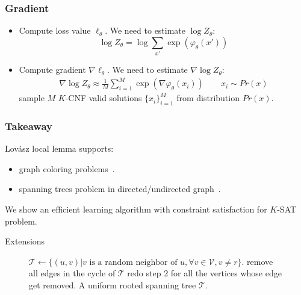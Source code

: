 \documentclass[numfooter,aspectratio=169]{beamer}
\begin{document}
\begin{frame}
\frametitle{Gradient}

\begin{itemize}
\item Compute loss value $\ell_{\theta}$. We need to estimate $\log Z_\theta$:
$$
\log Z_{\theta}=\log\sum_{x'}\exp({\varphi_{\theta}(x')})
$$
\item Compute gradient $\nabla \ell_\theta$. We need to estimate $\nabla\log Z_\theta$:
\begin{equation}\label{eq:mcmc}
\begin{aligned}
\nabla\log Z_\theta\approx \frac{1}{M} \sum_{i=1}^{M} \exp(\nabla\varphi_{\theta}(x_i)) \qquad x_i\sim Pr(x)
\end{aligned}
\end{equation}
sample $M$ $K$-CNF valid solutions $\{x_{i}\}_{i=1}^M$ from  distribution $Pr(x)$.
\end{itemize}
\end{frame}


\begin{frame}
\frametitle{Takeaway}
Lov\'asz local lemma supports:
\begin{itemize}
    \item graph coloring problems~\citep{DBLP:journals/dc/ChungPS17}.
    \item spanning trees problem in directed/undirected graph~\citep{DBLP:journals/jacm/GuoJL19}.
    
\end{itemize}
We show an efficient learning algorithm with constraint satisfaction for $K$-SAT problem.
\end{frame}

\begin{frame}{Extensions}
\begin{figure}
	\begin{algorithmic}[1]
    \State $\mathcal{T}\leftarrow \{(u,v)| v\text{ is a random neighbor of }u, \forall v\in \mathcal{V},v\neq r\}$.
    \State remove all edges in the cycle of $\mathcal{T}$
    \State redo step 2 for all the vertices whose edge get removed.
    \EndWhile
    \State \Return A uniform rooted spanning tree  $\mathcal{T}$.
\EndProcedure
	\end{algorithmic}
\end{figure}
\end{frame}
\end{document}
